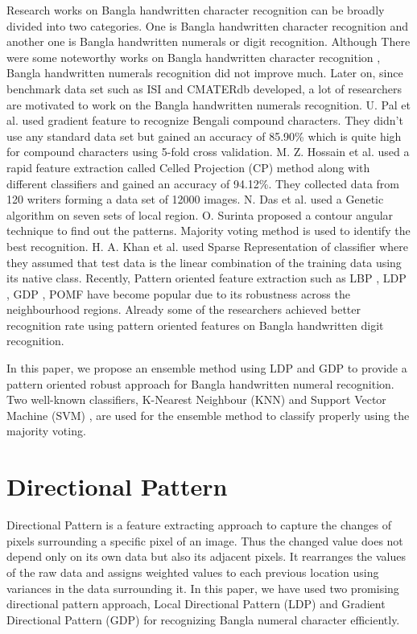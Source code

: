 \documentclass[conference]{IEEEtran}
\begin{document}
Research works on Bangla handwritten character recognition can be broadly divided into two categories. One is Bangla handwritten character recognition and another one is Bangla handwritten numerals or digit recognition. Although There were some noteworthy works on Bangla handwritten character recognition \cite{1998BHCR, 2004BHCR}, Bangla handwritten numerals recognition did not improve much. Later on, since benchmark data set such as ISI \cite{2006isi} and CMATERdb \cite{2009cmater} developed, a lot of researchers are motivated to work on the Bangla handwritten numerals recognition. U. Pal et al. \cite{2007gradientfeature} used gradient feature to recognize Bengali compound characters. They didn't use any standard data set but gained an accuracy of 85.90\% which is quite high for compound characters using 5-fold cross validation. M. Z. Hossain et al.\cite{2011rapidfeature} used a rapid feature extraction called Celled Projection (CP) method along with different classifiers and gained an accuracy of 94.12\%. They collected data from 120 writers forming a data set of 12000 images. N. Das et al. \cite{2012geneticalgorithm} used a Genetic algorithm on seven sets of local region. O. Surinta \cite{2013contourangular} proposed a contour angular technique to find out the patterns. Majority voting method is used to identify the best recognition. H. A. Khan et al. \cite{2014sparseclassifier} used Sparse Representation of classifier where they assumed that test data is the linear combination of the training data using its native class. Recently, Pattern oriented feature extraction such as LBP \cite{2002LBP}, LDP \cite{2010LDP}, GDP \cite{2012GDP}, POMF \cite{2017POMF} have become popular due to its robustness across the neighbourhood regions. Already some of the researchers \cite{2015LBP} achieved better recognition rate using pattern oriented features on Bangla handwritten digit recognition.

In this paper, we propose an ensemble method using LDP and GDP to provide a pattern oriented robust approach for Bangla handwritten numeral recognition. Two well-known classifiers, K-Nearest Neighbour (KNN) \cite{1967KNN} and Support Vector Machine (SVM) \cite{1995SVM}, are used for the ensemble method to classify properly using the majority voting. 

\section{Directional Pattern}
Directional Pattern is a feature extracting approach \cite{2002LBP,2010LDP,2012GDP,2017POMF} to capture the changes of pixels surrounding a specific pixel of an image. Thus the changed value does not depend only on its own data but also its adjacent pixels. It rearranges the values of the raw data and assigns weighted values to each previous location using variances in the data surrounding it. In this paper, we have used two promising directional pattern approach, Local Directional Pattern (LDP) \cite{2010LDP} and Gradient Directional Pattern (GDP) \cite{2012GDP} for recognizing Bangla numeral character efficiently.
\end{document}
